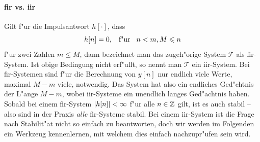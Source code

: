 \paragraph{\texorpdfstring{\acrshort{fir}}{FIR} vs. \texorpdfstring{\acrshort{iir}}{IIR}}
%
Gilt f"ur die Impulsantwort $h[\cdot]$, dass
\[
h[n] = 0, {\hspace{3mm} \text{f"ur} \hspace{3mm}} n < m, M \leqslant n
\]
f"ur zwei Zahlen $m \leqslant M$, dann bezeichnet man das zugeh"orige System $\mathcal{T}$ als \gls{fir}-System.
Ist obige Bedingung nicht erf"ullt, so nennt man $\mathcal{T}$ ein \gls{iir}-System.
Bei \gls{fir}-Systemen sind f"ur die Berechnung von $y[n]$ nur endlich viele Werte, maximal $M - m$ viele, notwendig.
Das System hat also ein endliches Ged"chtnis der L"ange $M - m$, wobei \gls{iir}-Systeme ein unendlich langes Ged"achtnis haben.
Sobald bei einem \gls{fir}-System ${\left| h[n] \right|} < \infty$ f"ur alle $n \in \mathbb{Z}$ gilt, ist es auch stabil -- also sind in der Praxis \emph{alle} \gls{fir}-Systeme stabil.
Bei einem \gls{iir}-System ist die Frage nach Stabilit"at nicht so einfach zu beantworten, doch wir werden im Folgenden ein Werkzeug kennenlernen, mit welchem dies einfach nachzupr"ufen sein wird.